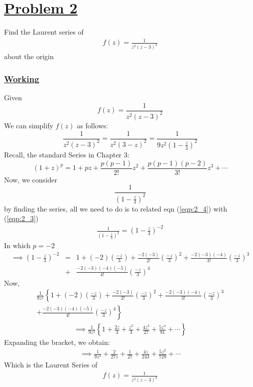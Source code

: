 \documentclass[11pt]{report}
\newcommand{\ubt}[1]{\textbf{\underline{#1}}}
\newcommand{\sps}{\\[0.2cm]}
\newcommand{\refn}[1]{(\ref{#1})}
\newcommand{\refxq}[1]{\refn{eqp:#1}}
\newcommand{\problem}[1]{\section*{\ubt{Problem #1}}}
\newcommand{\working}{\subsubsection{\ubt{Working}}}
\begin{document}
	
	\problem{2}
	Find the Laurent series of
	\begin{eqnarray*}
		f(z) = \frac{1}{z^2(z-3)^2}
	\end{eqnarray*}
	about the origin
	\working
	Given
	\begin{equation}
		f(z) = \frac{1}{z^2(z-3)^2} \tag{1}\label{eqp:2_1}
	\end{equation}
	We can simplify $f(z)$ as follows:
	\begin{equation}
		\frac{1}{z^2(z-3)^2} = \frac{1}{z^2(3-z)^2} = \frac{1}{9z^2\left(1-\frac{z}{3}\right)^2} \tag{2}\label{eqp:2_2}
	\end{equation}
	Recall, the standard Series in Chapter 3:
	\begin{equation}
			(1+z)^p = 1+ pz + \frac{p(p-1)}{2!}z^2 + \frac{p(p-1)(p-2)}{3!}z^3 + \cdots \tag{3}\label{eqp:2_3}
	\end{equation}
	Now, we consider 
	\begin{equation}
		\frac{1}{\left(1-\frac{z}{3}\right)^2} \tag{4}\label{eqp:2_4}
	\end{equation}
	by finding the series, all we need to do is to related eqn \refxq{2_4} with \refxq{2_3}
	\begin{eqnarray*}
		\frac{1}{\left(1-\frac{z}{3}\right)^2} = \left(1-\frac{z}{3}\right)^{-2}
	\end{eqnarray*} 
	In which $p=-2$
	\begin{eqnarray*}
		\implies \left(1-\frac{z}{3}\right)^{-2} &=& 1 + (-2) \left(\frac{-z}{3}\right) + \frac{-2(-3)}{2!}\left(\frac{-z}{3}\right)^2 + \frac{-2(-3)(-4)}{3!}\left(\frac{-z}{3}\right)^3\sps
		&+& \frac{-2(-3)(-4)(-5)}{4!}\left(\frac{-z}{3}\right)^4
	\end{eqnarray*}
	Now,
	\begin{gather*}
		\frac{1}{9z^2}\left\{ 1+ (-2)\left(\frac{-z}{3}\right) + \frac{-2(-3)}{2!}\left(\frac{-z}{3}\right)^2 + \frac{-2(-3)(-4)}{3!}\left(\frac{-z}{3}\right)^3 \right.\sps
		+ \left. \frac{-2(-3)(-4)(-5)}{4!}\left(\frac{-z}{3}\right)^4 \right\}
	\end{gather*}
	\begin{eqnarray*}
		\implies \frac{1}{9z^2}\left\{ 1 + \frac{2z}{3} + \frac{z^2}{3}+ \frac{4z^3}{27}+ \frac{5z^4}{81}+\cdots \right\}
	\end{eqnarray*}
	Expanding the bracket, we obtain:
	\begin{eqnarray*}
		\implies \frac{1}{9z^2} + \frac{2}{27z} + \frac{1}{27} + \frac{4z}{243} + \frac{5z^2}{729} + \cdots
	\end{eqnarray*}
	Which is the Laurent Series of
	\begin{eqnarray*}
		f(z) = \frac{1}{z^2(z-3)^2}
	\end{eqnarray*}
	
\end{document}
